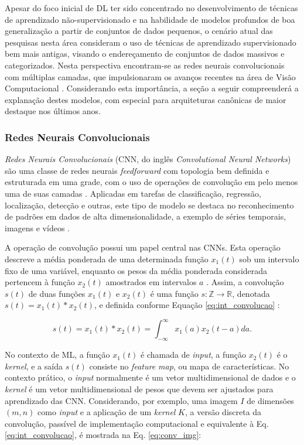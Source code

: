 Apesar do foco inicial de DL ter sido concentrado no desenvolvimento de técnicas de aprendizado não-supervisionado e na habilidade de modelos profundos de boa generalização a partir de conjuntos de dados pequenos, o cenário atual das pesquisas nesta área consideram o uso de técnicas de aprendizado supervisionado bem mais antigas, visando o endereçamento de conjuntos de dados massivos e categorizados.  Nesta perspectiva encontram-se as redes neurais convolucionais com múltiplas camadas, que impulsionaram os avanços recentes na área de Visão Computacional . Considerando esta importância, a seção a seguir compreenderá a explanação destes modelos, com especial para arquiteturas canônicas de maior destaque nos últimos anos.

\subsubsection{Redes Neurais Convolucionais} \label{subsubsec:rnc}

\emph{Redes Neurais Convolucionais} (CNN, do inglês \emph{Convolutional Neural Networks}) são uma classe de redes neurais \emph{feedforward} com topologia bem definida e estruturada em uma grade, com o uso de operações de convolução em pelo menos uma de suas camadas \cite{goodfellow2016deep}. Aplicadas em tarefas de classificação, regressão, localização, detecção e outras, este tipo de modelo se destaca no reconhecimento de padrões em dados de alta dimensionalidade, a exemplo de séries temporais, imagens e vídeos \cite{Khan:Livro}.

A operação de convolução possui um papel central nas CNNs. Esta operação descreve a média ponderada de uma determinada função $x_1(t)$ sob um intervalo fixo de uma variável, enquanto os pesos da média ponderada considerada pertencem à função $x_2(t)$ amostrados em intervalos $a$ \cite{bracewell1986fourier}. Assim, a convolução $s(t)$ de duas funções $x_1(t)$ e $x_2(t)$ é uma função $s: \mathds{Z} \rightarrow \mathds{R}$, denotada $s(t) = x_1(t) * x_2(t)$, e definida conforme Equação \ref{eq:int_convolucao} \cite{lathi2006sinais}:

\begin{equation}\label{eq:int_convolucao}
s(t) = x_1(t) * x_2(t) = \int_{-\infty}^{\infty} x_1(a) x_2(t-a)da.
\end{equation}

No contexto de ML, a função $x_1(t)$ é chamada de \emph{input}, a função $x_2(t)$ é o \emph{kernel}, e a saída $s(t)$ consiste no \emph{feature map}, ou mapa de características. No contexto prático, o \emph{input} normalmente é um vetor multidimensional de dados e o \emph{kernel} é um vetor multidimensional de pesos que devem ser ajustados para aprendizado das CNN. Considerando, por exemplo, uma imagem $I$ de dimensões $(m,n)$ como \emph{input} e a aplicação de um \emph{kernel} $K$, a versão discreta da convolução, passível de implementação computacional e equivalente à Eq. \ref{eq:int_convolucao}, é mostrada na Eq. \ref{eq:conv_img}:

